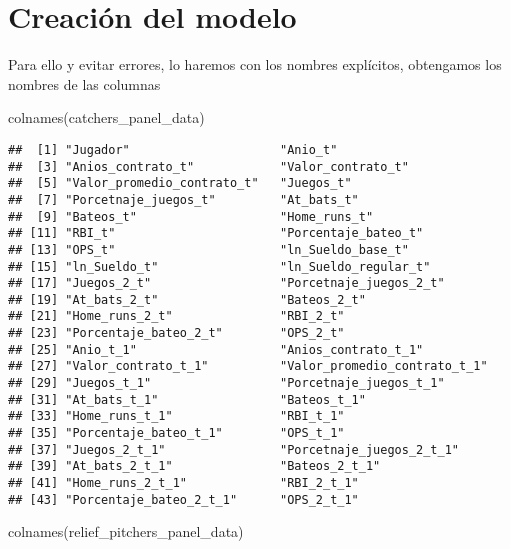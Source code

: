 \documentclass[
]{article}
\newenvironment{Shaded}{\begin{snugshade}}{\end{snugshade}}
\newcommand{\FunctionTok}[1]{\textcolor[rgb]{0.00,0.00,0.00}{#1}}
\newcommand{\NormalTok}[1]{#1}
\begin{document}
\section{Creación del modelo}

Para ello y evitar errores, lo haremos con los nombres explícitos,
obtengamos los nombres de las columnas

\begin{Shaded}
\begin{Highlighting}[]
\FunctionTok{colnames}\NormalTok{(catchers\_panel\_data)}
\end{Highlighting}
\end{Shaded}

\begin{verbatim}
##  [1] "Jugador"                     "Anio_t"                     
##  [3] "Anios_contrato_t"            "Valor_contrato_t"           
##  [5] "Valor_promedio_contrato_t"   "Juegos_t"                   
##  [7] "Porcetnaje_juegos_t"         "At_bats_t"                  
##  [9] "Bateos_t"                    "Home_runs_t"                
## [11] "RBI_t"                       "Porcentaje_bateo_t"         
## [13] "OPS_t"                       "ln_Sueldo_base_t"           
## [15] "ln_Sueldo_t"                 "ln_Sueldo_regular_t"        
## [17] "Juegos_2_t"                  "Porcetnaje_juegos_2_t"      
## [19] "At_bats_2_t"                 "Bateos_2_t"                 
## [21] "Home_runs_2_t"               "RBI_2_t"                    
## [23] "Porcentaje_bateo_2_t"        "OPS_2_t"                    
## [25] "Anio_t_1"                    "Anios_contrato_t_1"         
## [27] "Valor_contrato_t_1"          "Valor_promedio_contrato_t_1"
## [29] "Juegos_t_1"                  "Porcetnaje_juegos_t_1"      
## [31] "At_bats_t_1"                 "Bateos_t_1"                 
## [33] "Home_runs_t_1"               "RBI_t_1"                    
## [35] "Porcentaje_bateo_t_1"        "OPS_t_1"                    
## [37] "Juegos_2_t_1"                "Porcetnaje_juegos_2_t_1"    
## [39] "At_bats_2_t_1"               "Bateos_2_t_1"               
## [41] "Home_runs_2_t_1"             "RBI_2_t_1"                  
## [43] "Porcentaje_bateo_2_t_1"      "OPS_2_t_1"
\end{verbatim}

\begin{Shaded}
\begin{Highlighting}[]
\FunctionTok{colnames}\NormalTok{(relief\_pitchers\_panel\_data)}
\end{Highlighting}
\end{Shaded}
\end{document}
